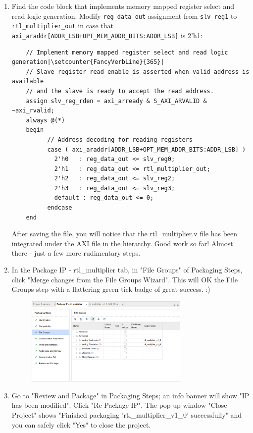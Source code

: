 \documentclass[a4paper,12pt,twoside]{article}
\begin{document}
\begin{enumerate}
\begin{verbatim}
    // wire to hold rtl_multiplier output|\setcounter{FancyVerbLine}{401}|
    wire [31:0] rtl_multiplier_out;
    // instantiate the rtl_multiplier
    rtl_multiplier rtl_mult_instance_01(
        .clk(S_AXI_ACLK),
        .a(slv_reg0[31:16]),
        .b(slv_reg0[15:0]),
        .product(rtl_multiplier_out)
    );
    \end{verbatim}
    \item Find the code block that implements memory mapped register select and read logic generation. Modify \verb|reg_data_out| assignment from \verb|slv_reg1| to \verb|rtl_multiplier_out| in case that \verb|axi_araddr[ADDR_LSB+OPT_MEM_ADDR_BITS:ADDR_LSB]| is 2'h1:
    \begin{verbatim}
    // Implement memory mapped register select and read logic generation|\setcounter{FancyVerbLine}{365}|
    // Slave register read enable is asserted when valid address is available
    // and the slave is ready to accept the read address.
    assign slv_reg_rden = axi_arready & S_AXI_ARVALID & ~axi_rvalid;
    always @(*)
    begin
          // Address decoding for reading registers
          case ( axi_araddr[ADDR_LSB+OPT_MEM_ADDR_BITS:ADDR_LSB] )
            2'h0   : reg_data_out <= slv_reg0;
            2'h1   : reg_data_out <= rtl_multiplier_out;
            2'h2   : reg_data_out <= slv_reg2;
            2'h3   : reg_data_out <= slv_reg3;
            default : reg_data_out <= 0;
          endcase
    end
    \end{verbatim}
    After saving the file, you will notice that the rtl\_multiplier.v file has been integrated under the AXI file in the hierarchy. Good work so far! Almost there - just a few more rudimentary steps.
    \item In the Package IP - rtl\_multiplier tab, in "File Groups" of Packaging Steps, click "Merge changes from the File Groups Wizard". This will OK the File Groups step with a flattering green tick badge of great success. :)
    \begin{figure}[H]
        \centering
        \includegraphics[width=0.75\textwidth]{images/25.png}
    \end{figure}
    \item Go to "Review and Package" in Packaging Steps; an info banner will show "IP has been modified". Click "Re-Package IP". The pop-up window "Close Project" shows "Finished packaging 'rtl\_multiplier\_v1\_0' successfully"  and you can safely click "Yes" to close the project.
\end{enumerate}
\end{document}
